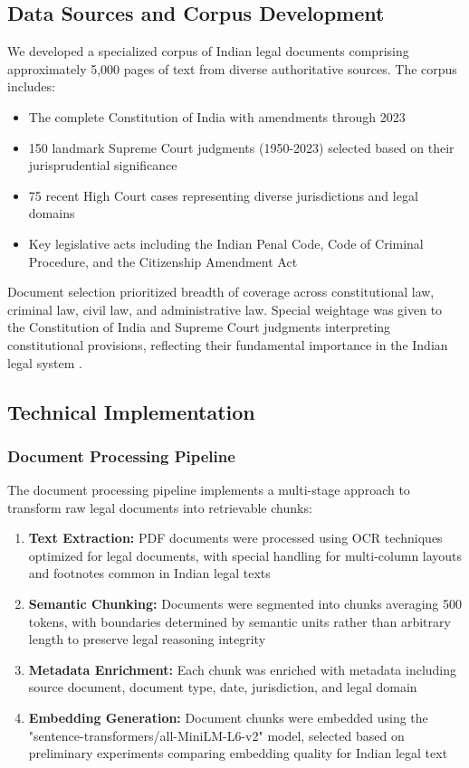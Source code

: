 \documentclass[conference]{IEEEtran}
\begin{document}
\subsection{Data Sources and Corpus Development}

We developed a specialized corpus of Indian legal documents comprising approximately 5,000 pages of text from diverse authoritative sources. The corpus includes:

\begin{itemize}
    \item The complete Constitution of India with amendments through 2023
    \item 150 landmark Supreme Court judgments (1950-2023) selected based on their jurisprudential significance
    \item 75 recent High Court cases representing diverse jurisdictions and legal domains
    \item Key legislative acts including the Indian Penal Code, Code of Criminal Procedure, and the Citizenship Amendment Act
\end{itemize}

Document selection prioritized breadth of coverage across constitutional law, criminal law, civil law, and administrative law. Special weightage was given to the Constitution of India and Supreme Court judgments interpreting constitutional provisions, reflecting their fundamental importance in the Indian legal system \cite{sathe2002}.

\subsection{Technical Implementation}

\subsubsection{Document Processing Pipeline}

The document processing pipeline implements a multi-stage approach to transform raw legal documents into retrievable chunks:

\begin{enumerate}
    \item \textbf{Text Extraction:} PDF documents were processed using OCR techniques optimized for legal documents, with special handling for multi-column layouts and footnotes common in Indian legal texts
    \item \textbf{Semantic Chunking:} Documents were segmented into chunks averaging 500 tokens, with boundaries determined by semantic units rather than arbitrary length to preserve legal reasoning integrity
    \item \textbf{Metadata Enrichment:} Each chunk was enriched with metadata including source document, document type, date, jurisdiction, and legal domain
    \item \textbf{Embedding Generation:} Document chunks were embedded using the "sentence-transformers/all-MiniLM-L6-v2" model, selected based on preliminary experiments comparing embedding quality for Indian legal text
\end{enumerate}
\end{document}
